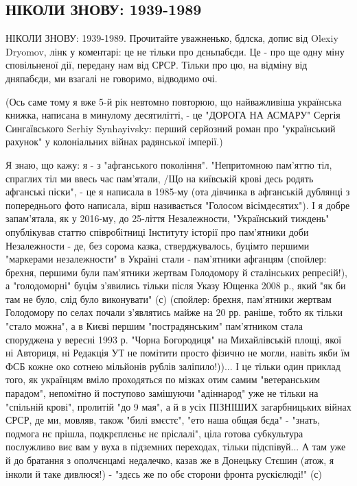  
 
 
 
 
\subsection{НІКОЛИ ЗНОВУ: 1939-1989}
\label{sec:11_05_2021.fb.zabuzhko_oksana.1.nikoly_znovu_1939_1989}

НІКОЛИ ЗНОВУ: 1939-1989. Прочитайте уважненько, бдлска, допис від Olexiy
Dryomov, лінк у коментарі: це не тільки про дєньпабєди. Це - про ще одну міну
сповільненої дії, передану нам від СРСР. Тільки про цю, на відміну від
дняпабєди, ми взагалі не говоримо, відводимо очі.

(Ось саме тому я вже 5-й рік невтомно повторюю, що найважливіша українська
книжка, написана в минулому десятилітті, - це "ДОРОГА НА АСМАРУ" Сергія
Сингаївського Serhiy Synhayivsky: перший серйозний роман про "український
рахунок" у колоніальних війнах радянської імперії.)

Я знаю, що кажу: я - з "афганського покоління". "Непритомною пам'яттю тіл,
спраглих тіл ми ввесь час пам'ятали, /Що на київській крові десь родять
афганські піски", - це я написала в 1985-му (ота дівчинка в афганській дублянці
з попереднього фото написала, вірш називається "Голосом вісімдесятих"). І я
добре запам'ятала, як у 2016-му, до 25-ліття Незалежности, "Український
тиждень" опублікував статтю співробітниці Інституту історії про пам'ятники доби
Незалежности - де, без сорома казка, стверджувалось, буцімто першими "маркерами
незалежности" в Україні стали - пам'ятники афганцям (спойлер: брехня, першими
були пам'ятники жертвам Голодомору й сталінських репресій!), а "голодоморні"
буцім з'явились тільки після Указу Ющенка 2008 р., який "як би там не було,
слід було виконувати" (с) (спойлер: брехня, пам'ятники жертвам Голодомору по
селах почали з'являтись майже на 20 рр. раніше, тобто як тільки "стало можна",
а в Києві першим "пострадянським" пам'ятником стала споруджена у вересні 1993
р. "Чорна Богородиця" на Михайлівській площі, якої ні Авториця, ні Редакція УТ
не помітити просто фізично не могли, навіть якби їм ФСБ кожне око сотнею
мільйонів рублів заліпило!))... І це тільки один приклад того, як українцям
вміло проходяться по мізках отим самим "ветеранським парадом", непомітно й
поступово замішуючи "адіннарод" уже не тільки на "спільній крові", пролитій "до
9 мая", а й в усіх ПІЗНІШИХ загарбницьких війнах СРСР, де ми, мовляв, також
"билі вмєстє", "ето наша общая бєда" - "знать, подмога нє прішла, подкрєплєньє
нє пріслалі", ціла готова субкультура послужливо виє вам у вуха в підземних
переходах, тільки підспівуй... А там уже й до братання з ополчєнцамі недалечко,
казав же в Донецьку Стєшин (атож, я інколи й таке дивлюся!) - "здєсь же по обє
сторони фронта рускієлюді!" (с)

